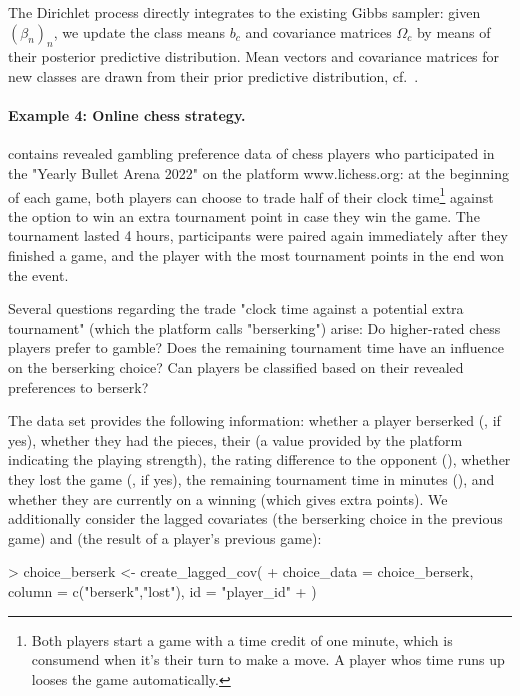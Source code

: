 \documentclass[article,shortnames]{jss}
\begin{document}
The Dirichlet process directly integrates to the existing Gibbs sampler: given $(\beta_n)_n$, we update the class means $b_c$ and covariance matrices $\Omega_c$ by means of their posterior predictive distribution. Mean vectors and covariance matrices for new classes are drawn from their prior predictive distribution, cf.\ \cite{Li:2019}.

\paragraph{Example 4: Online chess strategy.}

 contains revealed gambling preference data of chess players who participated in the "Yearly Bullet Arena 2022" on the platform www.lichess.org: at the beginning of each game, both players can choose to trade half of their clock time\footnote{Both players start a game with a time credit of one minute, which is consumend when it's their turn to make a move. A player whos time runs up looses the game automatically.} against the option to win an extra tournament point in case they win the game. The tournament lasted 4 hours, participants were paired again immediately after they finished a game, and the player with the most tournament points in the end won the event.

Several questions regarding the trade "clock time against a potential extra tournament" (which the platform calls "berserking") arise: Do higher-rated chess players prefer to gamble? Does the remaining tournament time have an influence on the berserking choice? Can players be classified based on their revealed preferences to berserk?

The  data set provides the following information: whether a player berserked (, if yes), whether they had the  pieces, their  (a value provided by the platform indicating the playing strength), the rating difference to the opponent (), whether they lost the game (, if yes), the remaining tournament time in minutes (), and whether they are currently on a winning  (which gives extra points). We additionally consider the lagged covariates  (the berserking choice in the previous game) and  (the result of a player's previous game):

\begin{Schunk}
\begin{Sinput}
> choice_berserk <- create_lagged_cov(
+    choice_data = choice_berserk, column = c("berserk","lost"), id = "player_id"
+  )
\end{Sinput}
\end{Schunk}
\end{document}
